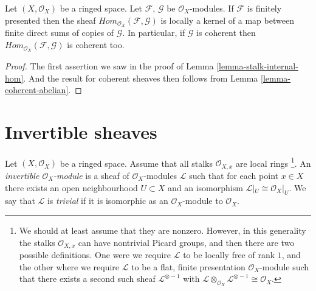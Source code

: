 \begin{lemma}
\label{lemma-internal-hom-locally-kernel-direct-sum}
Let $(X, \mathcal{O}_X)$ be a ringed space.
Let $\mathcal{F}$, $\mathcal{G}$ be $\mathcal{O}_X$-modules.
If $\mathcal{F}$ is finitely presented then the sheaf
$\textit{Hom}_{\mathcal{O}_X}(\mathcal{F}, \mathcal{G})$ is
locally a kernel of a map between finite direct sums
of copies of $\mathcal{G}$.
In particular, if $\mathcal{G}$ is coherent then
$\textit{Hom}_{\mathcal{O}_X}(\mathcal{F}, \mathcal{G})$
is coherent too.
\end{lemma}

\begin{proof}
The first assertion
we saw in the proof of Lemma \ref{lemma-stalk-internal-hom}.
And the result for coherent sheaves then follows from
Lemma \ref{lemma-coherent-abelian}.
\end{proof}






\section{Invertible sheaves}
\label{section-invertible}

\begin{definition}
\label{definition-invertible}
Let $(X, \mathcal{O}_X)$ be a ringed space.
Assume that all stalks $\mathcal{O}_{X, x}$ are local rings
\footnote{We should at least assume that they are nonzero.
However, in this generality the stalks $\mathcal{O}_{X, x}$
can have nontrivial Picard groups, and then there are two possible
definitions. One were we require $\mathcal{L}$ to be locally free
of rank $1$, and the other where we require
$\mathcal{L}$ to be a flat, finite presentation $\mathcal{O}_X$-module
such that there exists a second such sheaf $\mathcal{L}^{\otimes -1}$
with $\mathcal{L} \otimes_{\mathcal{O}_X} \mathcal{L}^{\otimes -1}
\cong \mathcal{O}_X$.}.
An {\it invertible $\mathcal{O}_X$-module} is a sheaf
of $\mathcal{O}_X$-modules $\mathcal{L}$ such that for each
point $x \in X$ there exists an open neighbourhood
$U \subset X$ and an isomorphism $\mathcal{L}|_U \cong \mathcal{O}_X|_U$.
We say that $\mathcal{L}$ is {\it trivial} if it is isomorphic
as an $\mathcal{O}_X$-module to $\mathcal{O}_X$.
\end{definition}

